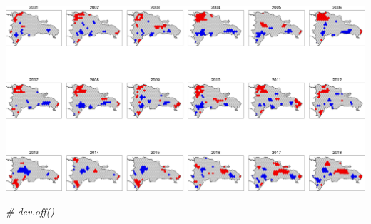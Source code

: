 \documentclass[10pt,landscape,a3paper]{article}
\newenvironment{Shaded}{\begin{snugshade}}{\end{snugshade}}
\newcommand{\CommentTok}[1]{\textcolor[rgb]{0.56,0.35,0.01}{\textit{#1}}}
\begin{document}
\begin{center}\includegraphics{img/modelling/aa-lisa-maps-1} \end{center}

\begin{Shaded}
\begin{Highlighting}[]
\CommentTok{\# dev.off()}


\end{Highlighting}
\end{Shaded}
\end{document}
